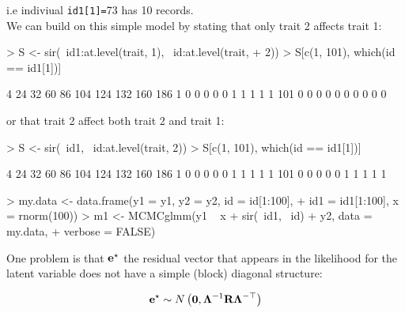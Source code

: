 \documentclass{article}
\begin{document}
i.e indiviual  \texttt{id1[1]=}73 has 10 records.\\

We can build on this simple model by stating that only trait 2 affects trait 1:

\begin{Schunk}
\begin{Sinput}
> S <- sir(~id1:at.level(trait, 1), ~id:at.level(trait, 
+     2))
> S[c(1, 101), which(id == id1[1])]
\end{Sinput}
\begin{Soutput}
    4 24 32 60 86 104 124 132 160 186
1   0  0  0  0  0   1   1   1   1   1
101 0  0  0  0  0   0   0   0   0   0
\end{Soutput}
\end{Schunk}

or that trait 2 affect both trait 2 and trait 1:

\begin{Schunk}
\begin{Sinput}
> S <- sir(~id1, ~id:at.level(trait, 2))
> S[c(1, 101), which(id == id1[1])]
\end{Sinput}
\begin{Soutput}
    4 24 32 60 86 104 124 132 160 186
1   0  0  0  0  0   1   1   1   1   1
101 0  0  0  0  0   1   1   1   1   1
\end{Soutput}
\end{Schunk}


\begin{Schunk}
\begin{Sinput}
> my.data <- data.frame(y1 = y1, y2 = y2, id = id[1:100], 
+     id1 = id1[1:100], x = rnorm(100))
> m1 <- MCMCglmm(y1 ~ x + sir(~id1, ~id) + y2, data = my.data, 
+     verbose = FALSE)
\end{Sinput}
\end{Schunk}

One problem is that ${\bf e}^{\star}$ the residual vector that appears in the likelihood for the latent variable does not have a simple (block) diagonal structure:

\begin{equation}
{\bf e}^{\star} \sim N\left({\bm 0}, {\bm \Lambda}^{-1}{\bf R}{\bm \Lambda}^{-\top}\right)
\end{equation}





\ifalone
\end{document}

